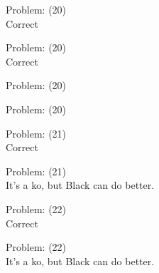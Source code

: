 \documentclass[11pt]{article}
\begin{document}
\begin{minipage}[t]{0.5\textwidth}
  {\centering
  
  Problem: (20)\\
  Correct\\
  }
\end{minipage}
\begin{minipage}[t]{0.5\textwidth}
  {\centering
  
  Problem: (20)\\
  Correct\\
  }
\end{minipage}
\begin{minipage}[t]{0.5\textwidth}
  {\centering
  
  Problem: (20)\\
  
  }
\end{minipage}
\begin{minipage}[t]{0.5\textwidth}
  {\centering
  
  Problem: (20)\\
  
  }
\end{minipage}
\begin{minipage}[t]{0.5\textwidth}
  {\centering
  
  Problem: (21)\\
  Correct\\
  }
\end{minipage}
\begin{minipage}[t]{0.5\textwidth}
  {\centering
  
  Problem: (21)\\
  It's a ko, but Black can do better.\\
  }
\end{minipage}
\begin{minipage}[t]{0.5\textwidth}
  {\centering
  
  Problem: (22)\\
  Correct\\
  }
\end{minipage}
\begin{minipage}[t]{0.5\textwidth}
  {\centering
  
  Problem: (22)\\
  It's a ko, but Black can do better.\\
  }
\end{minipage}
\end{document}
